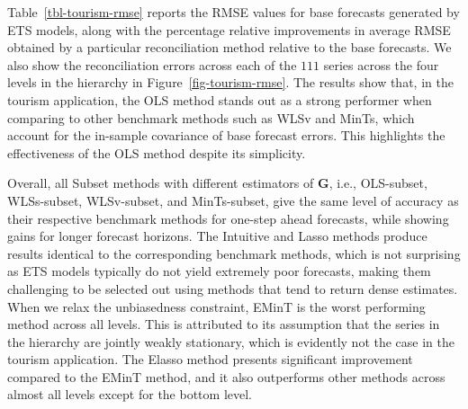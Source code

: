 \documentclass[11pt,a4paper,]{article}
\begin{document}
Table~\ref{tbl-tourism-rmse} reports the RMSE values for base forecasts
generated by ETS models, along with the percentage relative improvements
in average RMSE obtained by a particular reconciliation method relative
to the base forecasts. We also show the reconciliation errors across
each of the \(111\) series across the four levels in the hierarchy in
Figure~\ref{fig-tourism-rmse}. The results show that, in the tourism
application, the OLS method stands out as a strong performer when
comparing to other benchmark methods such as WLSv and MinTs, which
account for the in-sample covariance of base forecast errors. This
highlights the effectiveness of the OLS method despite its simplicity.

Overall, all Subset methods with different estimators of
\(\boldsymbol{G}\), i.e., OLS-subset, WLSs-subset, WLSv-subset, and
MinTs-subset, give the same level of accuracy as their respective
benchmark methods for one-step ahead forecasts, while showing gains for
longer forecast horizons. The Intuitive and Lasso methods produce
results identical to the corresponding benchmark methods, which is not
surprising as ETS models typically do not yield extremely poor
forecasts, making them challenging to be selected out using methods that
tend to return dense estimates. When we relax the unbiasedness
constraint, EMinT is the worst performing method across all levels. This
is attributed to its assumption that the series in the hierarchy are
jointly weakly stationary, which is evidently not the case in the
tourism application. The Elasso method presents significant improvement
compared to the EMinT method, and it also outperforms other methods
across almost all levels except for the bottom level.
\end{document}
